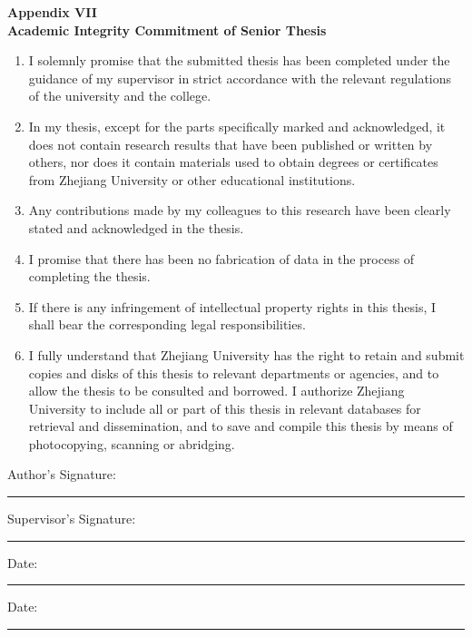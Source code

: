\documentclass[12pt,a4paper]{report}
\newcommand{\signatureline}[1]{%
  \noindent #1\hspace{0.5em}\rule{0.32\textwidth}{0.4pt}
}
\begin{document}
\clearpage
\begin{center}
{\bfseries Appendix VII}\\[0.5em]
{\bfseries\fontsize{18}{22}\selectfont Academic Integrity Commitment of Senior Thesis}
\end{center}

\begin{enumerate}[leftmargin=*,label=\arabic*.]
\item I solemnly promise that the submitted thesis has been completed under the guidance of my supervisor in strict accordance with the relevant regulations of the university and the college.
\item In my thesis, except for the parts specifically marked and acknowledged, it does not contain research results that have been published or written by others, nor does it contain materials used to obtain degrees or certificates from Zhejiang University or other educational institutions.
\item Any contributions made by my colleagues to this research have been clearly stated and acknowledged in the thesis.
\item I promise that there has been no fabrication of data in the process of completing the thesis.
\item If there is any infringement of intellectual property rights in this thesis, I shall bear the corresponding legal responsibilities.
\item I fully understand that Zhejiang University has the right to retain and submit copies and disks of this thesis to relevant departments or agencies, and to allow the thesis to be consulted and borrowed. I authorize Zhejiang University to include all or part of this thesis in relevant databases for retrieval and dissemination, and to save and compile this thesis by means of photocopying, scanning or abridging.
\end{enumerate}

\vspace{3em}
\signatureline{Author's Signature:}
\hfill
\signatureline{Supervisor's Signature:}

\vspace{2em}
\signatureline{Date:}
\hfill
\signatureline{Date:}
\end{document}
